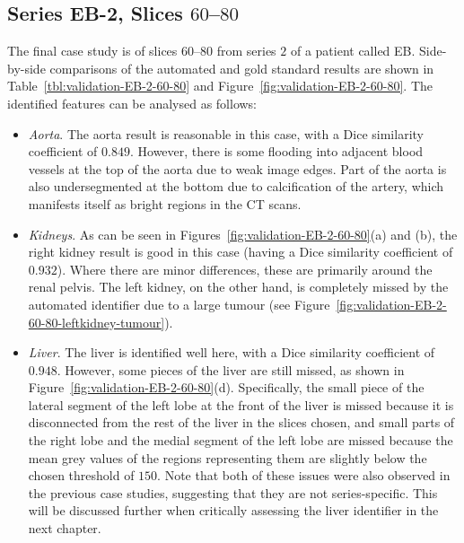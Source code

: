 \afterpage{\clearpage}
\newpage

\subsection{Series EB-2, Slices $60$--$80$}

The final case study is of slices $60$--$80$ from series $2$ of a patient called EB. Side-by-side comparisons of the automated and gold standard results are shown in Table~\ref{tbl:validation-EB-2-60-80} and Figure~\ref{fig:validation-EB-2-60-80}. The identified features can be analysed as follows:
%
\begin{itemize}

\item \emph{Aorta}. The aorta result is reasonable in this case, with a Dice similarity coefficient of $0.849$. However, there is some flooding into adjacent blood vessels at the top of the aorta due to weak image edges. Part of the aorta is also undersegmented at the bottom due to calcification of the artery, which manifests itself as bright regions in the CT scans.

\item \emph{Kidneys}. As can be seen in Figures~\ref{fig:validation-EB-2-60-80}(a) and (b), the right kidney result is good in this case (having a Dice similarity coefficient of $0.932$). Where there are minor differences, these are primarily around the renal pelvis. The left kidney, on the other hand, is completely missed by the automated identifier due to a large tumour (see Figure~\ref{fig:validation-EB-2-60-80-leftkidney-tumour}).

\item \emph{Liver}. The liver is identified well here, with a Dice similarity coefficient of $0.948$. However, some pieces of the liver are still missed, as shown in Figure~\ref{fig:validation-EB-2-60-80}(d). Specifically, the small piece of the lateral segment of the left lobe at the front of the liver is missed because it is disconnected from the rest of the liver in the slices chosen, and small parts of the right lobe and the medial segment of the left lobe are missed because the mean grey values of the regions representing them are slightly below the chosen threshold of $150$. Note that both of these issues were also observed in the previous case studies, suggesting that they are not series-specific. This will be discussed further when critically assessing the liver identifier in the next chapter.


\end{itemize}
